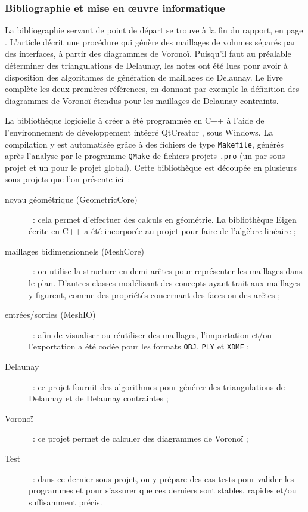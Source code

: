 \documentclass[12pt,a4paper]{report}
\begin{document}
\vspace{1cm}
\subsubsection{Bibliographie et mise en \oe{}uvre informatique}

La bibliographie servant de point de départ se trouve à la fin du rapport, en page \pageref{biblio}. L'article \cite{Garimella} décrit une procédure qui génère des maillages de volumes séparés par des interfaces, à partir des diagrammes de Voronoï. Puisqu'il faut au préalable déterminer des triangulations de Delaunay, les notes \cite{delnotes} ont été lues pour avoir à disposition des algorithmes de génération de maillages de Delaunay. Le livre \cite{Edelsbrunner} complète les deux premières références, en donnant par exemple la définition des diagrammes de Voronoï étendus pour les maillages de Delaunay contraints.

\vspace{1cm}

La bibliothèque logicielle à créer a été programmée en C++ à l'aide de l'environnement de développement intégré QtCreator \cite{QtCreator}, sous Windows. La compilation y est automatisée grâce à des fichiers de type \verb+Makefile+, générés après l'analyse par le programme \verb+QMake+ de fichiers projets \verb+.pro+ (un par sous-projet et un pour le projet global).
Cette bibliothèque est découpée en plusieurs sous-projets que l'on présente ici~:
\begin{description}
\item[noyau géométrique (GeometricCore)]~: cela permet d'effectuer des calculs en géométrie. La bibliothèque Eigen \cite{Eigen} écrite en C++ a été incorporée au projet pour faire de l'algèbre linéaire ;
\item[maillages bidimensionnels (MeshCore)]~: on utilise la structure en demi-arêtes pour représenter les maillages dans le plan. D'autres classes modélisant des concepts ayant trait aux maillages y figurent, comme des propriétés concernant des faces ou des arêtes ;
\item[entrées/sorties (MeshIO)]~: afin de visualiser ou réutiliser des maillages, l'importation et/ou l'exportation a été codée pour les formats \verb+OBJ+, \verb+PLY+ et \verb+XDMF+\footnotemark {} ;
\item[Delaunay]~: ce projet fournit des algorithmes pour générer des triangulations de Delaunay et de Delaunay contraintes ;
\item[Voronoï]~: ce projet permet de calculer des diagrammes de Voronoï ;
\item[Test]~: dans ce dernier sous-projet, on y prépare des cas tests pour valider les programmes et pour s'assurer que ces derniers sont stables, rapides et/ou suffisamment précis.
\end{description}
\end{document}
